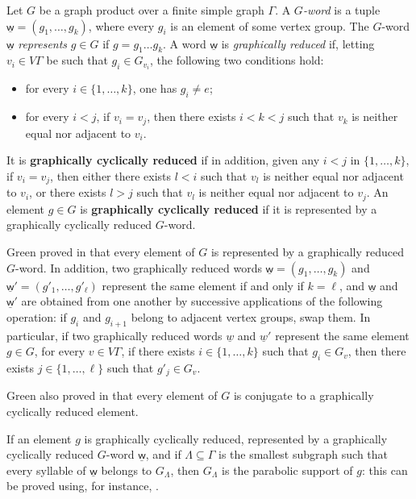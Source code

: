 \documentclass[a4paper,english,11pt]{article}
\theoremstyle{definition}
\theoremstyle{remark}
\newcommand{\deffont}[1]{\textbf{#1}}
\begin{document}
Let $G$ be a graph product over a finite simple graph $\Gamma$. A \emph{$G$-word} is a tuple $\underline{\mathsf{w}}=(g_1,\dots,g_k)$, where every $g_i$ is an element of some vertex group. 
The $G$-word $\underline{\mathsf{w}}$ \emph{represents} $g\in G$ if $g=g_1\dots g_k$. A word $\underline{\mathsf{w}}$ is \emph{graphically reduced} if, letting $v_i\in V\Gamma$ be such that $g_i\in G_{v_i}$, the following two conditions hold: 
\begin{itemize}
    \item for every $i\in\{1,\dots,k\}$, one has $g_i\neq e$;
    \item for every $i<j$, if $v_i=v_j$, then there exists $i<k<j$ such that $v_k$ is neither equal nor adjacent to $v_i$. 
\end{itemize}
It is \deffont{graphically cyclically reduced} if in addition, given any $i<j$ in $\{1,\dots,k\}$, if $v_i=v_j$, then either there exists $l<i$ such that $v_l$ is neither equal nor adjacent to $v_i$, or there exists $l>j$ such that $v_l$ is neither equal nor adjacent to $v_j$. An element $g\in G$ is \deffont{graphically cyclically reduced} if it is represented by a graphically cyclically reduced $G$-word.

Green proved in \cite[Theorem~3.9]{Gre} that every element of $G$ is represented by a graphically reduced $G$-word. In addition, two graphically reduced words $\underline{\mathsf{w}}=(g_1,\dots,g_k)$ and $\underline{\mathsf{w}}'=(g'_1,\dots,g'_\ell)$ represent the same element if and only if $k=\ell$, and $\underline{\mathsf{w}}$ and $\underline{\mathsf{w}}'$ are obtained from one another by successive applications of the following operation: if $g_i$ and $g_{i+1}$ belong to adjacent vertex groups, swap them. In particular, if two graphically reduced words $\underline{w}$ and $\underline{w}'$ represent the same element $g\in G$, for every $v\in V\Gamma$, if there exists $i\in\{1,\dots,k\}$ such that $g_i\in G_v$, then there exists $j\in\{1,\dots,\ell\}$ such that $g'_{j}\in G_v$.

Green also proved in \cite[Lemma~3.16]{Gre} that every element of $G$ is conjugate to a graphically cyclically reduced element.

If an element $g$ is graphically cyclically reduced, represented by a graphically cyclically reduced $G$-word $\underline{\mathsf{w}}$, and if $\Lambda\subseteq\Gamma$ is the smallest subgraph such that every syllable of $\underline{\mathsf{w}}$ belongs to $G_\Lambda$, then $G_\Lambda$ is the parabolic support of $g$: this can be proved using, for instance, \cite[Theorem~5.5]{Gen2}.
\end{document}
